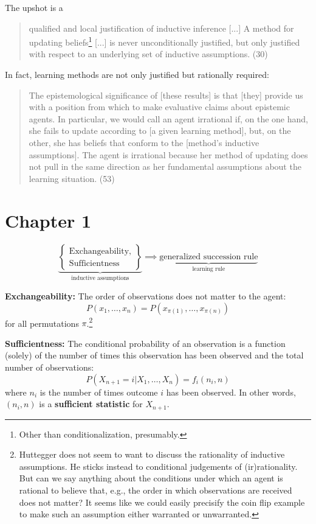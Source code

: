 \documentclass{my-tufte}
\begin{document}
The upshot is a
\begin{quote}
	qualified and local justification of inductive inference [...] A method for updating beliefs\footnote{Other than conditionalization, presumably.} [...] is never unconditionally justified, but only justified with respect to an underlying set of inductive assumptions. (30)
\end{quote}

In fact, learning methods are not only justified but rationally required:
\begin{quote}
	The epistemological significance of [these results] is that [they] provide us with a position from which to make evaluative claims about epistemic agents. In particular, we would call an agent irrational if, on the one hand, she fails to update according to [a given learning method], but, on the other, she has beliefs that conform to the [method's inductive assumptions]. The agent is irrational because her method of updating does  not pull in the same direction as her fundamental assumptions about the learning situation. (53)
\end{quote}

\section{Chapter 1}
\[
\underbrace{\left \{ \begin{array}{l}
		\text{Exchangeability,}\\
		\text{Sufficientness}
	\end{array} \right \}}_{\text{inductive assumptions}}
	\implies
	\underbrace{\text{generalized succession rule}}_{\text{learning rule}}
\]

\textbf{Exchangeability:} The order of observations does not matter to the agent:
\[
P(x_1, \dots, x_n) = P(x_{\pi(1)}, \dots, x_{\pi(n)})
\]
for all permutations $\pi$.\footnote{Huttegger does not seem to want to discuss the rationality of inductive assumptions. He sticks instead to conditional judgements of (ir)rationality. But can we say anything about the conditions under which an agent is rational to believe that, e.g., the order in which observations are received does not matter? It seems like we could easily precisify the coin flip example to make such an assumption either warranted or unwarranted.}

\textbf{Sufficientness:} The conditional probability of an observation is a function (solely) of the number of times this observation has been observed and the total number of observations:
\[
	P(X_{n+1} = i | X_1, \dots, X_n) = f_i(n_i, n)
\]
where $n_i$ is the number of times outcome $i$ has been observed. In other words, $(n_i, n)$ is a \textbf{sufficient statistic} for $X_{n+1}$.
\end{document}
